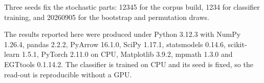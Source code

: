 \documentclass[openacc]{rsproca_new}
\begin{document}
Three seeds fix the stochastic parts: 12345 for the corpus build, 1234 for
classifier training, and 20260905 for the bootstrap and permutation draws.

The results reported here were produced under Python 3.12.3 with NumPy 1.26.4,
pandas 2.2.2, PyArrow 16.1.0, SciPy 1.17.1, statsmodels 0.14.6,
scikit-learn 1.5.1, PyTorch 2.11.0 on CPU, Matplotlib 3.9.2, mpmath 1.3.0 and
EGTtools 0.1.14.2. The classifier is trained on CPU and its seed is fixed, so
the read-out is reproducible without a GPU.


\FloatBarrier

\printbibliography
\end{document}
